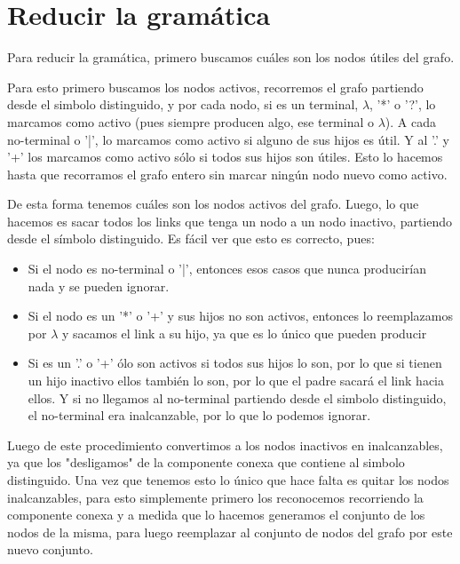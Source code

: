 \documentclass[a4paper]{report}
\begin{document}
\section*{Reducir la gramática}

	Para reducir la gramática, primero buscamos cuáles son los nodos útiles
del grafo.


	Para esto primero buscamos los nodos activos, recorremos el grafo partiendo desde el
simbolo distinguido, y por cada nodo, si es un terminal, $\lambda$, '*' o '?', lo
marcamos como activo (pues siempre producen algo, ese terminal o $\lambda$). A cada
no-terminal o '|', lo marcamos como activo si alguno de sus hijos es útil. Y al
'.' y '+' los marcamos como activo sólo si todos sus hijos son útiles. Esto lo
hacemos hasta que recorramos el grafo entero sin marcar ningún nodo nuevo como activo.


	De esta forma tenemos cuáles son los nodos activos del grafo. Luego, lo
que hacemos es sacar todos los links que tenga un nodo a un nodo inactivo,
partiendo desde el símbolo distinguido. Es fácil ver que esto es correcto, pues:


\begin{itemize}
\item Si el nodo es no-terminal o '|', entonces esos casos que nunca producirían nada
y se pueden ignorar.

\item Si el nodo es un '*' o '+' y sus hijos no son activos,
entonces lo reemplazamos por $\lambda$ y sacamos el link a su hijo, ya que es lo
único que pueden producir 

\item Si es un '.' o '+' ólo son activos si todos sus hijos lo son, por lo que si tienen un hijo 
inactivo ellos también lo son, por lo que
el padre sacará el link hacia ellos. Y si no llegamos al no-terminal partiendo
desde el simbolo distinguido, el no-terminal era inalcanzable, por lo que lo podemos ignorar.
\end{itemize}


	Luego de este procedimiento convertimos a los nodos inactivos en inalcanzables, 
ya que los "desligamos" de la componente conexa que contiene al simbolo distinguido. Una vez 
que tenemos esto lo único que hace falta es quitar los nodos inalcanzables, para esto simplemente 
primero los reconocemos recorriendo la componente conexa y a medida que lo hacemos generamos 
el conjunto de los nodos de la misma, para luego reemplazar al conjunto de nodos del grafo 
por este nuevo conjunto.
\end{document}
